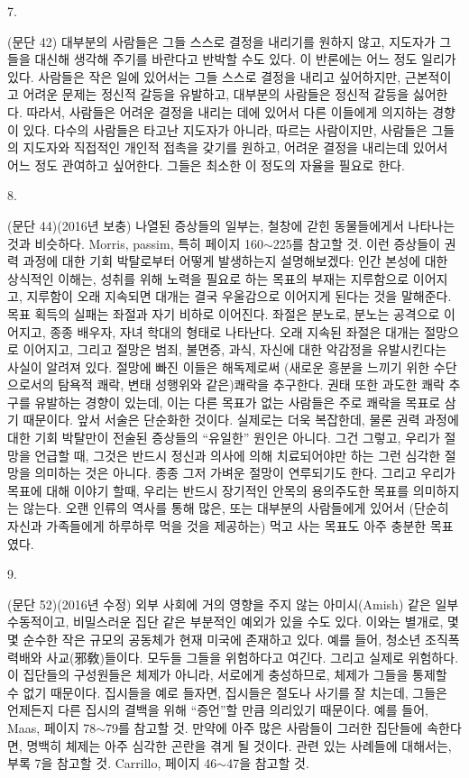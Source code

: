 \documentclass[11pt,a4paper]{article}
\begin{document}
\begin{multicols}{2}
\hypertarget{7}{7.} (문단 42) 대부분의 사람들은 그들 스스로 결정을 내리기를 원하지 않고, 지도자가 그들을 대신해  생각해 주기를 바란다고 반박할 수도 있다. 이 반론에는 어느 정도 일리가 있다. 사람들은 작은 일에  있어서는 그들 스스로 결정을 내리고 싶어하지만, 근본적이고 어려운 문제는 정신적 갈등을 유발하고,  대부분의 사람들은 정신적 갈등을 싫어한다. 따라서, 사람들은 어려운 결정을 내리는 데에 있어서 다른  이들에게 의지하는 경향이 있다. 다수의 사람들은 타고난 지도자가 아니라, 따르는 사람이지만, 사람들은  그들의 지도자와 직접적인 개인적 접촉을 갖기를 원하고, 어려운 결정을 내리는데 있어서 어느 정도  관여하고 싶어한다. 그들은 최소한 이 정도의 자율을 필요로 한다. 


\hypertarget{8}{8.} (문단 44)(2016년 보충) 나열된 증상들의 일부는, 철창에 갇힌 동물들에게서 나타나는 것과  비슷하다. Morris, passim, 특히 페이지 160${\sim}$225를 참고할 것. 이런 증상들이 권력 과정에 대한 기회  박탈로부터 어떻게 발생하는지 설명해보겠다: 인간 본성에 대한 상식적인 이해는, 성취를 위해 노력을  필요로 하는 목표의 부재는 지루함으로 이어지고, 지루함이 오래 지속되면 대개는 결국 우울감으로  이어지게 된다는 것을 말해준다. 목표 획득의 실패는 좌절과 자기 비하로 이어진다. 좌절은 분노로,  분노는 공격으로 이어지고, 종종 배우자, 자녀 학대의 형태로 나타난다. 오래 지속된 좌절은 대개는  절망으로 이어지고, 그리고 절망은 범죄, 불면증, 과식, 자신에 대한 악감정을 유발시킨다는 사실이  알려져 있다. 절망에 빠진 이들은 해독제로써 (새로운 흥분을 느끼기 위한 수단으로서의 탐욕적 쾌락, 
변태 성행위와 같은)쾌락을 추구한다. 권태 또한 과도한 쾌락 추구를 유발하는 경향이 있는데, 이는 다른  목표가 없는 사람들은 주로 쾌락을 목표로 삼기 때문이다. 앞서 서술은 단순화한 것이다. 실제로는 더욱  복잡한데, 물론 권력 과정에 대한 기회 박탈만이 전술된 증상들의 “유일한” 원인은 아니다. 그건 그렇고,  
우리가 절망을 언급할 때, 그것은 반드시 정신과 의사에 의해 치료되어야만 하는 그런 심각한 절망을  의미하는 것은 아니다. 종종 그저 가벼운 절망이 연루되기도 한다. 그리고 우리가 목표에 대해 이야기  할때, 우리는 반드시 장기적인 안목의 용의주도한 목표를 의미하지는 않는다. 오랜 인류의 역사를 통해  많은, 또는 대부분의 사람들에게 있어서 (단순히 자신과 가족들에게 하루하루 먹을 것을 제공하는) 먹고  사는 목표도 아주 충분한 목표였다. 


\hypertarget{9}{9.} (문단 52)(2016년 수정) 외부 사회에 거의 영향을 주지 않는 아미시(Amish) 같은 일부 수동적이고,  비밀스러운 집단 같은 부분적인 예외가 있을 수도 있다. 이와는 별개로, 몇몇 순수한 작은 규모의  공동체가 현재 미국에 존재하고 있다. 예를 들어, 청소년 조직폭력배와 사교(邪敎)들이다. 모두들 그들을  위험하다고 여긴다. 그리고 실제로 위험하다. 이 집단들의 구성원들은 체제가 아니라, 서로에게  충성하므로, 체제가 그들을 통제할 수 없기 때문이다. 집시들을 예로 들자면, 집시들은 절도나 사기를 잘 치는데, 그들은 언제든지 다른 집시의 결백을 위해 “증언”할 만큼 의리있기 때문이다. 예를 들어, Maas,  페이지 78${\sim}$79를 참고할 것. 만약에 아주 많은 사람들이 그러한 집단들에 속한다면, 명백히 체제는 아주  심각한 곤란을 겪게 될 것이다. 관련 있는 사례들에 대해서는, 부록 7을 참고할 것. Carrillo, 페이지  46${\sim}$47을 참고할 것. 



\end{multicols}
\end{document}
